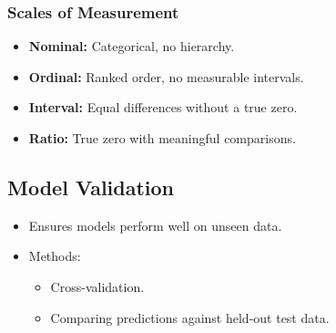 \subsubsection{Scales of Measurement}
\begin{itemize}
    \item \textbf{Nominal:} Categorical, no hierarchy.
    \item \textbf{Ordinal:} Ranked order, no measurable intervals.
    \item \textbf{Interval:} Equal differences without a true zero.
    \item \textbf{Ratio:} True zero with meaningful comparisons.
\end{itemize}

\subsection{Model Validation}
\begin{itemize}
    \item Ensures models perform well on unseen data.
    \item Methods:
    \begin{itemize}
        \item Cross-validation.
        \item Comparing predictions against held-out test data.
    \end{itemize}
\end{itemize}
